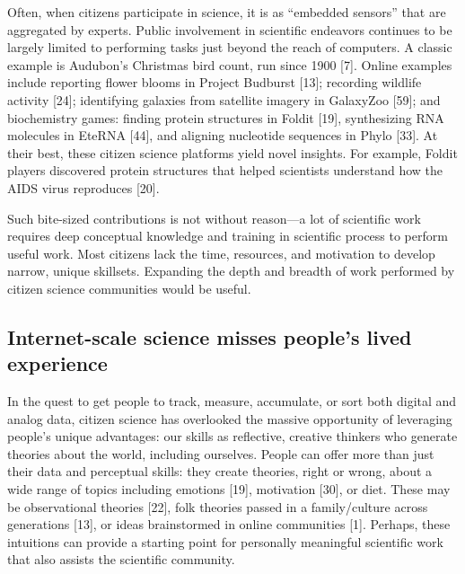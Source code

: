Often, when citizens participate in science, it is as “embedded sensors” that 
are aggregated by experts. Public involvement in scientific endeavors continues
to be largely limited to performing tasks just beyond the reach of computers.
A classic example is Audubon’s Christmas bird count, run since 1900
[7]. Online examples include reporting flower blooms in
Project Budburst [13]; recording wildlife activity [24];
identifying galaxies from satellite imagery in GalaxyZoo
[59]; and biochemistry games: finding protein structures in
Foldit [19], synthesizing RNA molecules in EteRNA [44], and aligning 
nucleotide sequences in Phylo [33]. At their
best, these citizen science platforms yield novel insights.
For example, Foldit players discovered protein structures
that helped scientists understand how the AIDS virus reproduces [20]. 

 Such bite-sized contributions is not without reason—a lot of
scientific work requires deep conceptual knowledge and 
training in scientific process to perform useful work. Most
citizens lack the time, resources, and motivation to develop
narrow, unique skillsets. Expanding the depth and breadth of work 
performed by citizen science communities would be useful.

\subsection{Internet-scale science misses people’s lived experience}
In the quest to get people to track, measure, accumulate, or
sort both digital and analog data, citizen science has overlooked the massive opportunity of leveraging people’s
unique advantages: our skills as reflective, creative thinkers
who generate theories about the world, including ourselves.
People can offer more than just their data and perceptual
skills: they create theories, right or wrong, about a wide
range of topics including emotions [19], motivation [30], or
diet. These may be observational theories [22], folk theories
passed in a family/culture across generations [13], or ideas
brainstormed in online communities [1]. Perhaps, these intuitions can provide a starting point for personally meaningful
scientific work that also assists the scientific community.

